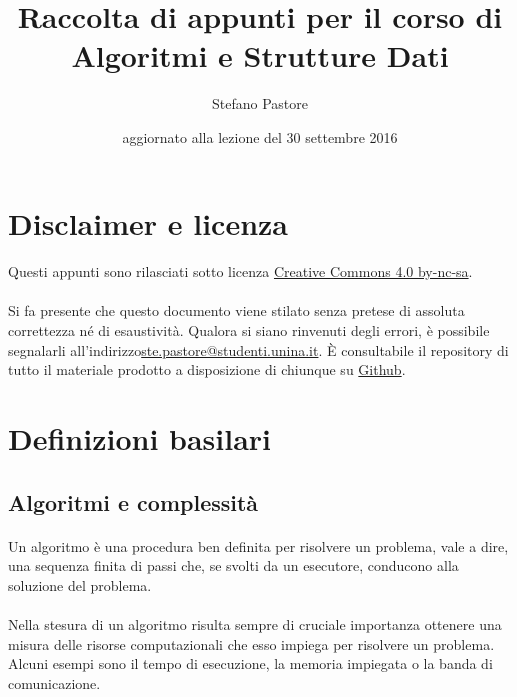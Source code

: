 \documentclass[11pt,a4paper,oneside]{article}
\title{Raccolta di appunti per il corso di\\\Huge{Algoritmi e Strutture Dati}}
\author{Stefano Pastore}
\date{\tiny{aggiornato alla lezione del 30 settembre 2016}}
\begin{document}

\maketitle
\pagebreak
\tableofcontents
\pagebreak

\section*{Disclaimer e licenza}
\paragraph*{} Questi appunti sono rilasciati sotto licenza \href{https://creativecommons.org/licenses/by-nc-sa/4.0/}{Creative Commons 4.0 by-nc-sa}.
\paragraph*{} Si fa presente che questo documento viene stilato senza pretese di assoluta correttezza né di esaustività. Qualora si siano rinvenuti degli errori, è possibile segnalarli all'indirizzo\linebreak \href{mailto:ste.pastore@studenti.unina.it}{ste.pastore@studenti.unina.it}. È consultabile il repository di tutto il materiale prodotto a disposizione di chiunque su \href{https://github.com/stefano-pastore/asd}{Github}.
\pagebreak
\section{Definizioni basilari}
\subsection{Algoritmi e complessità}
\paragraph*{} Un algoritmo è una procedura ben definita per risolvere un problema, vale a dire, una sequenza finita di passi che, se svolti da un esecutore, conducono alla soluzione del problema.
\paragraph*{} Nella stesura di un algoritmo risulta sempre di cruciale importanza ottenere una misura delle risorse computazionali che esso impiega per risolvere un problema. Alcuni esempi sono il tempo di esecuzione, la memoria impiegata o la banda di comunicazione.
\end{document}
